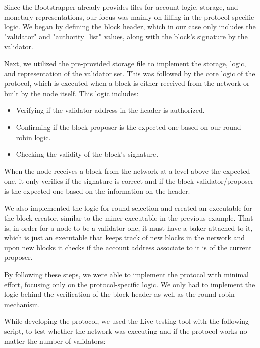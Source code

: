 Since the Bootstrapper already provides files for account logic, storage, and monetary representations, our focus was mainly on filling in the protocol-specific logic. We began by defining the block header, which in our case only includes the "validator" and "authority\_list" values, along with the block's signature by the validator.

Next, we utilized the pre-provided storage file to implement the storage, logic, and representation of the validator set. This was followed by the core logic of the protocol, which is executed when a block is either received from the network or built by the node itself. This logic includes:

\begin{itemize}
    \item Verifying if the validator address in the header is authorized.
    \item Confirming if the block proposer is the expected one based on our round-robin logic.
    \item Checking the validity of the block's signature.
\end{itemize}

When the node receives a block from the network at a level above the expected one, it only verifies if the signature is correct and if the block validator/proposer is the expected one based on the information on the header.


We also implemented the logic for round selection and created an executable for the block creator, similar to the miner executable in the previous example. That is, in order for a node to be a validator one, it must have a baker attached to it, which is just an executable that keeps track of new blocks in the network and upon new blocks it checks if the account address associate to it is of the current proposer.

By following these steps, we were able to implement the protocol with minimal effort, focusing only on the protocol-specific logic. We only had to implement the logic behind the verification of the block header as well as the round-robin  mechanism.

While developing the protocol, we used the Live-testing tool with the following script, to test whether the network was executing and if the protocol works no matter the number of validators:

